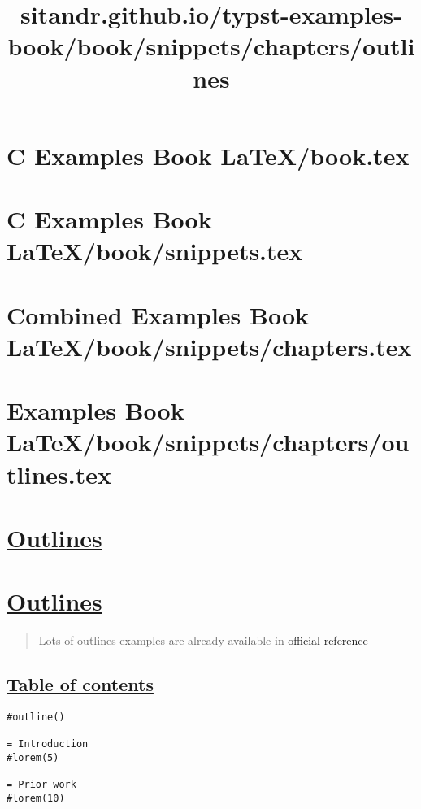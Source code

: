 \section{C Examples Book LaTeX/book.tex}
\section{C Examples Book LaTeX/book/snippets.tex}
\section{Combined Examples Book LaTeX/book/snippets/chapters.tex}
\section{Examples Book LaTeX/book/snippets/chapters/outlines.tex}
\title{sitandr.github.io/typst-examples-book/book/snippets/chapters/outlines}

\section{\texorpdfstring{\hyperref[outlines]{Outlines}}{Outlines}}\label{outlines}

\section{\texorpdfstring{\hyperref[outlines-1]{Outlines}}{Outlines}}\label{outlines-1}

\begin{quote}
Lots of outlines examples are already available in
\href{https://typst.app/docs/reference/meta/outline/}{official
reference}
\end{quote}

\subsection{\texorpdfstring{\hyperref[table-of-contents]{Table of
contents}}{Table of contents}}\label{table-of-contents}

\begin{verbatim}
#outline()

= Introduction
#lorem(5)

= Prior work
#lorem(10)
\end{verbatim}

\pandocbounded{}

